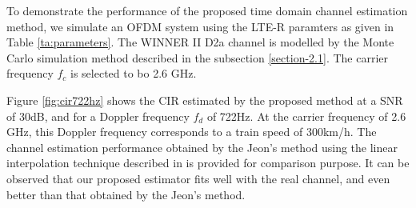 \documentclass[12pt,journal,draftclsnofoot,onecolumn]{IEEEtran}
\begin{document}
{{{To demonstrate the performance of the proposed time domain channel estimation method, we simulate an OFDM system using the LTE-R paramters as given in Table \ref{ta:parameters}. The  WINNER II D2a channel  is modelled by the Monte Carlo simulation method described in the subsection \ref{section-2.1}. The carrier frequency $f_c$ is selected to bo 2.6 GHz.

				
Figure \ref{fig:cir722hz} shows  the  CIR estimated by the proposed method at a SNR of  30dB, and for a Doppler frequency  $f_{d}$ of 722Hz. At the carrier frequency of 2.6 GHz, this Doppler frequency corresponds to a train speed of 300km/h. The channel estimation performance obtained by the Jeon's method using the linear interpolation technique described in \cite{Jeon1999} is provided for comparison purpose. It can be observed that our proposed estimator fits well with the real channel, and even better than that obtained by the  Jeon's method. 


}}}
\end{document}

